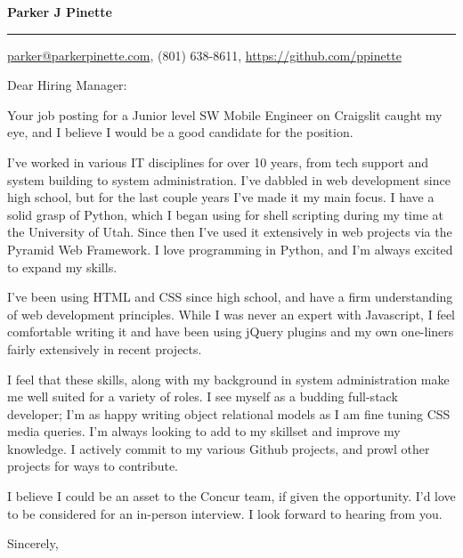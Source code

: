 \documentclass{letter}
\begin{document}
\signature{Parker J Pinette}
\longindentation=8pt
\let\raggedleft\raggedright
\headsep=20pt

\begin{letter}{}

\begin{flushleft}
 {\large\bf Parker J Pinette}
\end{flushleft}
\medskip\hrule height 1pt
\begin{flushright}
 \hfill \href{mailto:parker@parkerpinette.com}{parker@parkerpinette.com}, (801) 638-8611, \url{https://github.com/ppinette} 
\end{flushright}
\vfill

\opening{Dear Hiring Manager:}

\noindent Your job posting for a Junior level SW Mobile Engineer on Craigslit caught my eye, and I believe I would be a good candidate for the position.  

\noindent I've worked in various IT disciplines for over 10 years, from tech support and system building to system administration. I've dabbled in web development since high school, but for the last couple years I've made it my main focus. I have a solid grasp of Python, which I began using for shell scripting during my time at the University of Utah. Since then I've used it extensively in web projects via the Pyramid Web Framework. I love programming in Python, and I'm always excited to expand my skills. 

\noindent I've been using HTML and CSS since high school, and have a firm understanding of web development principles. While I was never an expert with Javascript, I feel comfortable writing it and have been using jQuery plugins and my own one-liners fairly extensively in recent projects. 

\noindent I feel that these skills, along with my background in system administration make me well suited for a variety of roles. I see myself as a budding full-stack developer; I'm as happy writing object relational models as I am fine tuning CSS media queries. I'm always looking to add to my skillset and improve my knowledge. I actively commit to my various Github projects, and prowl other projects for ways to contribute.

\noindent I believe I could be an asset to the Concur team, if given the opportunity. I'd love to be considered for an in-person interview. I look forward to hearing from you.

\closing{Sincerely,}
\end{letter}
\end{document}
